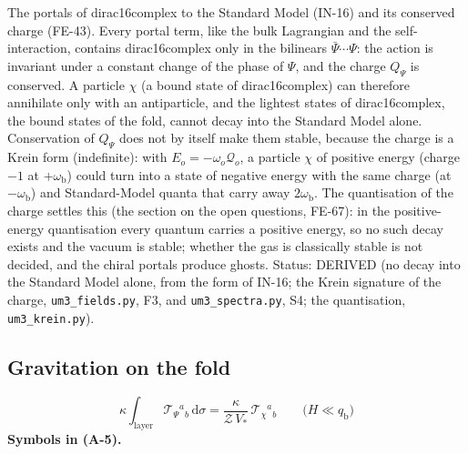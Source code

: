 \documentclass[
  10pt,
]{article}
\begin{document}
The portals of dirac16complex to the Standard Model (IN-16) and its
conserved charge (FE-43). Every portal term, like the bulk Lagrangian
and the self-interaction, contains dirac16complex only in the bilinears
\(\bar\Psi\cdots\Psi\): the action is invariant under a constant change
of the phase of \(\Psi\), and the charge \(Q_\Psi\) is conserved. A
particle \(\chi\) (a bound state of dirac16complex) can therefore
annihilate only with an antiparticle, and the lightest states of
dirac16complex, the bound states of the fold, cannot decay into the
Standard Model alone. Conservation of \(Q_\Psi\) does not by itself make
them stable, because the charge is a Krein form (indefinite): with
\(E_o = -\omega_o\mathcal{Q}_o\), a particle \(\chi\) of positive energy
(charge \(-1\) at \(+\omega_{\mathrm{b}}\)) could turn into a state of
negative energy with the same charge (at \(-\omega_{\mathrm{b}}\)) and
Standard-Model quanta that carry away \(2\omega_{\mathrm{b}}\). The
quantisation of the charge settles this (the section on the open
questions, FE-67): in the positive-energy quantisation every quantum
carries a positive energy, so no such decay exists and the vacuum is
stable; whether the gas is classically stable is not decided, and the
chiral portals produce ghosts. Status: DERIVED (no decay into the
Standard Model alone, from the form of IN-16; the Krein signature of the
charge, \texttt{um3\_fields.py}, F3, and \texttt{um3\_spectra.py}, S4;
the quantisation, \texttt{um3\_krein.py}).

\hypertarget{gravitation-on-the-fold}{%
\subsection{Gravitation on the fold}\label{gravitation-on-the-fold}}

\[
\kappa\int_{\text{layer}}\mathcal{T}_\Psi{}^a{}_b\,\mathrm{d}\sigma = \frac{\kappa}{\mathcal{Z}\,V_*}\,\mathcal{T}_\chi{}^a{}_b\qquad\big(H \ll q_{\mathrm{b}}\big) \tag{A-5}
\] \textbf{Symbols in (A-5).}
\end{document}
